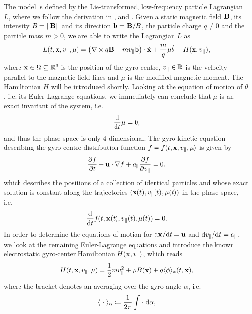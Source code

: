 The model is defined by the Lie-transformed, low-frequency particle Lagrangian $L$, where we follow the derivation in \cite{Bottino_Sonnendrucker_2015}, \cite{emily} and \cite{Latu_2017}. Given a static magnetic field $\mathbf{B}$, its intensity $B = \norm{\mathbf{B}}$ and its direction $\mathbf{b} = \mathbf{B} / B$, the particle charge $q \not= 0$ and the particle mass $m >0$,  
we are able to write the Lagrangian $L$ as
\begin{equation}\label{Lagrangian}
	L(t, \mathbf{x}, v_\parallel, \mu) = \left(\nabla \times q\mathbf{B} + m v_\parallel \mathbf{b} \right)\cdot\dot{\mathbf{x}} + \frac{m}{q} \mu \dot{\theta} - H(\mathbf{x}, v_\parallel),
\end{equation}
where $\mathbf{x} \in \Omega \subseteq \mathbb{R}^3$ is the position of the gyro-centre, $v_\parallel \in \mathbb{R}$ is the velocity parallel to the magnetic field lines and $\mu$ is the modified magnetic moment. The Hamiltonian $H$ will be introduced shortly.
Looking at the equation of motion of $\theta$, i.e. its Euler-Lagrange equations, we immediately can conclude that $\mu$ is an exact invariant of the system, i.e.
\begin{equation}
	\frac{\text{d} }{\text{d} t} \mu = 0,
\end{equation}
and thus the phase-space is only $4$-dimensional.
The gyro-kinetic equation describing the gyro-centre distribution function $f=f(t,\mathbf{x}, v_\parallel, \mu)$ is given by 
\begin{equation}\label{drift-kinetic model}
	\frac{\partial f}{\partial t} + \mathbf{u} \cdot \nabla f + a_\parallel \frac{\partial f}{\partial v_\parallel} = 0,
\end{equation}
which describes the positions of a collection of identical particles and whose exact solution is constant along the trajectories $(\mathbf{x}(t), v_\parallel(t), \mu(t))$ in the phase-space, i.e. 
\begin{equation}
	\frac{\dd}{\dd t} f(t,\mathbf{x}(t), v_\parallel(t), \mu(t)) = 0.
\end{equation}
In order to determine the equations of motion for ${\dd \mathbf{x}}/{\dd t} = \mathbf{u}$ and ${\dd v_\parallel}/{\dd t} = a_\parallel$, we look at the remaining Euler-Lagrange equations and introduce the known electrostatic gyro-center Hamiltonian $H(\mathbf{x}, v_\parallel)$, which reads
\begin{equation}
	H(t, \mathbf{x}, v_\parallel, \mu) = \frac{1}{2} m v_\parallel^2 + \mu B(\mathbf{x}) + q \langle \phi \rangle_\alpha (t,\mathbf{x}),
\end{equation}
where the bracket denotes an averaging over the gyro-angle $\alpha$, i.e.
\begin{equation}
	 \langle \;\cdot\; \rangle_\alpha \coloneqq \frac{1}{2\pi} \int \cdot \ \dd \alpha,
\end{equation}
